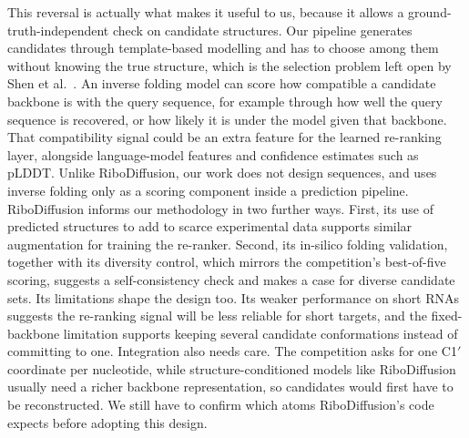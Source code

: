 \documentclass{FastFyp}
\begin{document}
This reversal is actually what makes it useful to us, because it allows a ground-truth-independent check on candidate structures. Our pipeline generates candidates through template-based modelling and has to choose among them without knowing the true structure, which is the selection problem left open by Shen et al.~\cite{ref:Shen:2024}. An inverse folding model can score how compatible a candidate backbone is with the query sequence, for example through how well the query sequence is recovered, or how likely it is under the model given that backbone. That compatibility signal could be an extra feature for the learned re-ranking layer, alongside language-model features and confidence estimates such as pLDDT. Unlike RiboDiffusion, our work does not design sequences, and uses inverse folding only as a scoring component inside a prediction pipeline. RiboDiffusion informs our methodology in two further ways. First, its use of predicted structures to add to scarce experimental data supports similar augmentation for training the re-ranker. Second, its in-silico folding validation, together with its diversity control, which mirrors the competition's best-of-five scoring, suggests a self-consistency check and makes a case for diverse candidate sets. Its limitations shape the design too. Its weaker performance on short RNAs suggests the re-ranking signal will be less reliable for short targets, and the fixed-backbone limitation supports keeping several candidate conformations instead of committing to one. Integration also needs care. The competition asks for one C1$'$ coordinate per nucleotide, while structure-conditioned models like RiboDiffusion usually need a richer backbone representation, so candidates would first have to be reconstructed. We still have to confirm which atoms RiboDiffusion's code expects before adopting this design.
\end{document}
